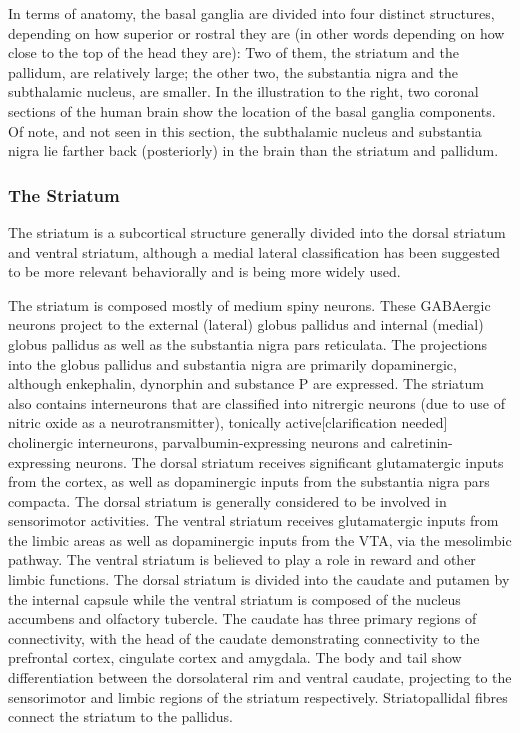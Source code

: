 In terms of anatomy, the basal ganglia are divided into four distinct structures, depending on how superior or rostral they are (in other words depending on how close to the top of the head they are): Two of them, the striatum and the pallidum, are relatively large; the other two, the substantia nigra and the subthalamic nucleus, are smaller. In the illustration to the right, two coronal sections of the human brain show the location of the basal ganglia components. Of note, and not seen in this section, the subthalamic nucleus and substantia nigra lie farther back (posteriorly) in the brain than the striatum and pallidum.

\hypertarget{the-striatum}{%
\subsubsection{The Striatum}\label{the-striatum}}

The striatum is a subcortical structure generally divided into the dorsal striatum and ventral striatum, although a medial lateral classification has been suggested to be more relevant behaviorally and is being more widely used.

The striatum is composed mostly of medium spiny neurons. These GABAergic neurons project to the external (lateral) globus pallidus and internal (medial) globus pallidus as well as the substantia nigra pars reticulata. The projections into the globus pallidus and substantia nigra are primarily dopaminergic, although enkephalin, dynorphin and substance P are expressed. The striatum also contains interneurons that are classified into nitrergic neurons (due to use of nitric oxide as a neurotransmitter), tonically active{[}clarification needed{]} cholinergic interneurons, parvalbumin-expressing neurons and calretinin-expressing neurons. The dorsal striatum receives significant glutamatergic inputs from the cortex, as well as dopaminergic inputs from the substantia nigra pars compacta. The dorsal striatum is generally considered to be involved in sensorimotor activities. The ventral striatum receives glutamatergic inputs from the limbic areas as well as dopaminergic inputs from the VTA, via the mesolimbic pathway. The ventral striatum is believed to play a role in reward and other limbic functions. The dorsal striatum is divided into the caudate and putamen by the internal capsule while the ventral striatum is composed of the nucleus accumbens and olfactory tubercle. The caudate has three primary regions of connectivity, with the head of the caudate demonstrating connectivity to the prefrontal cortex, cingulate cortex and amygdala. The body and tail show differentiation between the dorsolateral rim and ventral caudate, projecting to the sensorimotor and limbic regions of the striatum respectively. Striatopallidal fibres connect the striatum to the pallidus.

